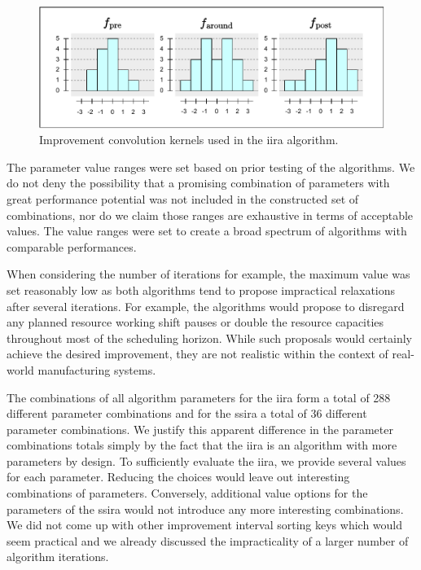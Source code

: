 \begin{figure}[hbt]
    \centering
    \includegraphics[width=\textwidth]{img/Convolutions.pdf}
    \caption{Improvement convolution kernels used in the \ac{iira} algorithm.}
    \label{fig:convolutions}
\end{figure}

The parameter value ranges were set based on prior testing of the algorithms.
We do not deny the possibility that a promising combination of parameters
with great performance potential was not included in the constructed set of combinations,
nor do we claim those ranges are exhaustive in terms of acceptable values.
The value ranges were set to create a broad spectrum of algorithms with comparable performances.

When considering the number of iterations for example,
the maximum value was set reasonably low as both algorithms
tend to propose impractical relaxations after several iterations.
For example, the algorithms would propose to disregard any planned resource working shift pauses
or double the resource capacities throughout most of the scheduling horizon.
While such proposals would certainly achieve the desired improvement,
they are not realistic within the context of real-world manufacturing systems.

The combinations of all algorithm parameters
for the \ac{iira} form a total of 288 different parameter combinations and
for the \ac{ssira} a total of 36 different parameter combinations.
We justify this apparent difference in the parameter combinations totals
simply by the fact that the \ac{iira} is an algorithm with more parameters by design.
To sufficiently evaluate the \ac{iira}, we provide several values for each parameter.
Reducing the choices would leave out interesting combinations of parameters.
Conversely, additional value options for the parameters of the \ac{ssira}
would not introduce any more interesting combinations.
We did not come up with other improvement interval sorting keys which would seem practical
and we already discussed the impracticality of a larger number of algorithm iterations.


